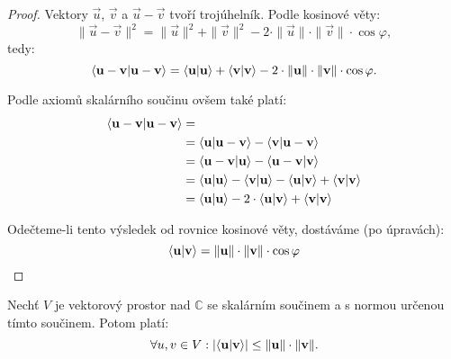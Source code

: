 \begin{proof}
    Vektory $\vec{u}$, $\vec{v}$ a $\vec{u}-\vec{v}$ tvoří trojúhelník.
    Podle kosinové věty: $$\|\vec{u} - \vec{v}\|^2 = \|\vec{u}\|^2
    + \|\vec{v}\|^2 - 2 \cdot \|\vec{u}\| \cdot \|\vec{v}\| \cdot 
    \cos \varphi,$$
    tedy:
    $$
        \langle \mathbf{u}-\mathbf{v} | \mathbf{u}-\mathbf{v} \rangle = \langle \mathbf{u} | \mathbf{u} \rangle +
        \langle \mathbf{v} | \mathbf{v} \rangle - 2 \cdot \|\mathbf{u}\| \cdot \|\mathbf{v}\| \cdot 
        \cos \varphi.$$

    Podle axiomů skalárního součinu ovšem také platí:
    \begin{align*}
        \langle \mathbf{u}-\mathbf{v} | \mathbf{u}-\mathbf{v} \rangle &= \\
        &= \langle \mathbf{u} | \mathbf{u}-\mathbf{v} \rangle - \langle \mathbf{v} | \mathbf{u}-\mathbf{v} \rangle \\
        &= \langle \mathbf{u} - \mathbf{v} | \mathbf{u} \rangle - \langle \mathbf{u} - 
            \mathbf{v} | \mathbf{v} \rangle \\
        &= \langle \mathbf{u} | \mathbf{u} \rangle - \langle \mathbf{v} | \mathbf{u} \rangle - 
            \langle \mathbf{u} | \mathbf{v} \rangle + \langle \mathbf{v} | \mathbf{v} \rangle \\
        &= \langle \mathbf{u} | \mathbf{u} \rangle - 2\cdot \langle \mathbf{u} | \mathbf{v} \rangle 
            + \langle \mathbf{v} | \mathbf{v} \rangle
    \end{align*}

    Odečteme-li tento výsledek od rovnice kosinové věty, dostáváme (po 
    úpravách):
    $$ \langle \mathbf{u} | \mathbf{v} \rangle = \|\mathbf{u}\|\cdot\|\mathbf{v}\|\cdot \cos 
    \varphi $$
\end{proof}

\begin{theorem}
    Nechť $V$ je vektorový prostor nad $\mathbb{C}$ se skalárním součinem
    a s normou určenou tímto součinem. Potom platí:
    $$ \forall u,v \in V: |\langle \mathbf{u} | \mathbf{v} \rangle| \leq \|\mathbf{u}\| \cdot
    \|\mathbf{v}\|. $$
\end{theorem}

